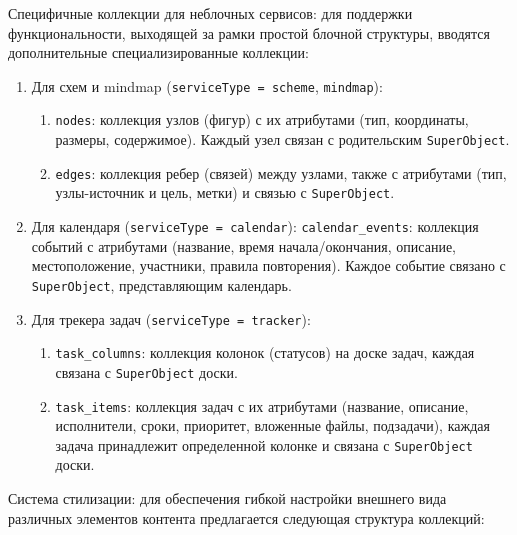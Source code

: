 Специфичные коллекции для неблочных сервисов: для поддержки функциональности, выходящей за рамки простой блочной структуры, вводятся дополнительные специализированные коллекции:
    \begin{enumerate}[wide=12.5mm, leftmargin=12.5mm]
        \item Для схем и mindmap (\texttt{serviceType = scheme}, \texttt{mindmap}):
            \begin{enumerate}[wide=12.5mm, leftmargin=12.5mm]
                \item \texttt{nodes}: коллекция узлов (фигур) с их атрибутами (тип, координаты, размеры, содержимое). Каждый узел связан с родительским \texttt{SuperObject}.
                \item \texttt{edges}: коллекция ребер (связей) между узлами, также с атрибутами (тип, узлы-источник и цель, метки) и связью с \texttt{SuperObject}.
            \end{enumerate}
        \item Для календаря (\texttt{serviceType = calendar}): \texttt{calendar\_events}: коллекция событий с атрибутами (название, время начала/окончания, описание, местоположение, участники, правила повторения). Каждое событие связано с \texttt{SuperObject}, представляющим календарь.
        \item Для трекера задач (\texttt{serviceType = tracker}):
            \begin{enumerate}[wide=12.5mm, leftmargin=12.5mm]
                \item \texttt{task\_columns}: коллекция колонок (статусов) на доске задач, каждая связана с \texttt{SuperObject} доски.
                \item \texttt{task\_items}: коллекция задач с их атрибутами (название, описание, исполнители, сроки, приоритет, вложенные файлы, подзадачи), каждая задача принадлежит определенной колонке и связана с \texttt{SuperObject} доски.
             \end{enumerate}
    \end{enumerate}
\clearpage
Система стилизации: для обеспечения гибкой настройки внешнего вида различных элементов контента предлагается следующая структура коллекций:
